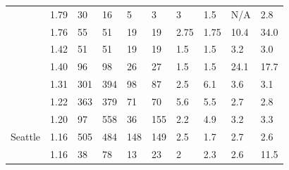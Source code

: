 \documentclass[utf8]{FrontiersinHarvard} %
\begin{document}
\begin{table}[h!]
\begin{ssmall}
\begin{tabular}{llllllllll}
			\cite{Temereanca:2017aa}         & 1.79      & 30                                   & 16                                      & 5                            & 3                                          & 3         & 1.5       & N/A       & 2.8       \\
			\cite{Yu:2022aa}                 & 1.76      & 55                                   & 51                                      & 19                           & 19                                         & 2.75      & 1.75      & 10.4      & 34.0      \\
			\citet{sivay_hiv-1_2018}         & 1.42      & 51                                   & 51                                      & 19                           & 19                                         & 1.5       & 1.5       & 3.2       & 3.0       \\
			\cite{Zai:2020aa}                & 1.40      & 96                                   & 98                                      & 26                           & 27                                         & 1.5       & 1.5       & 24.1      & 17.7      \\ %
			\cite{Little:2014aa}             & 1.31      & 301                                  & 394                                     & 98                           & 87                                         & 2.5       & 6.1       & 3.6       & 3.1       \\ %
			\cite{brenner_role_2021}         & 1.22      & 363                                  & 379                                     & 71                           & 70                                         & 5.6       & 5.5       & 2.7       & 2.8       \\
			\cite{Stecher:2018aa}            & 1.20      & 97                                   & 558                                     & 36                           & 155                                        & 2.2       & 4.9       & 3.2       & 3.3       \\
			\cite{chato_public_2020} Seattle & 1.16      & 505                                  & 484                                     & 148                          & 149                                        & 2.5       & 1.7       & 2.7       & 2.6       \\
			\cite{Billings:2019aa}           & 1.16      & 38                                   & 78                                      & 13                           & 23                                         & 2         & 2.3       & 2.6       & 11.5      \\

\end{tabular}
\end{ssmall}
\end{table}
\end{document}
